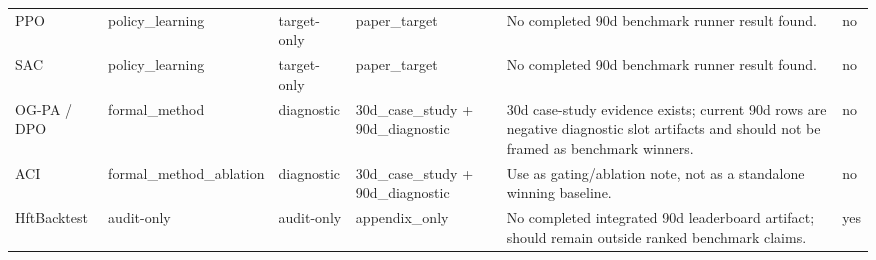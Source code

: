 \begin{table}[t]
\begin{tabular}{llllll}
PPO & policy\_learning & target-only & paper\_target & No completed 90d benchmark runner result found. & no \\
SAC & policy\_learning & target-only & paper\_target & No completed 90d benchmark runner result found. & no \\
OG-PA / DPO & formal\_method & diagnostic & 30d\_case\_study + 90d\_diagnostic & 30d case-study evidence exists; current 90d rows are negative diagnostic slot artifacts and should not be framed as benchmark winners. & no \\
ACI & formal\_method\_ablation & diagnostic & 30d\_case\_study + 90d\_diagnostic & Use as gating/ablation note, not as a standalone winning baseline. & no \\
HftBacktest & audit-only & audit-only & appendix\_only & No completed integrated 90d leaderboard artifact; should remain outside ranked benchmark claims. & yes \\
\bottomrule
\end{tabular}
\end{table}
